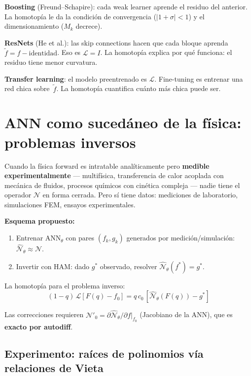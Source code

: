 \documentclass[11pt,a4paper]{article}
\begin{document}
\textbf{Boosting} (Freund--Schapire): cada weak learner aprende el residuo del anterior. La homotop\'ia le da la condici\'on de convergencia ($|1+\sigma|<1$) y el dimensionamiento ($M_k$ decrece).

\textbf{ResNets} (He et al.): las skip connections hacen que cada bloque aprenda $\tilde{f} = f - \text{identidad}$. Eso es $\mathcal{L} = I$. La homotop\'ia explica por qu\'e funciona: el residuo tiene menor curvatura.

\textbf{Transfer learning}: el modelo preentrenado es $\mathcal{L}$. Fine-tuning es entrenar una red chica sobre~$\tilde{f}$. La homotop\'ia cuantifica cu\'anto m\'as chica puede ser.


\section{ANN como suced\'aneo de la f\'isica: problemas inversos}
\label{sec:inverse}

Cuando la f\'isica forward es intratable anal\'iticamente pero \textbf{medible experimentalmente} --- multif\'isica, transferencia de calor acoplada con mec\'anica de fluidos, procesos qu\'imicos con cin\'etica compleja --- nadie tiene el operador $\mathcal{N}$ en forma cerrada. Pero s\'i tiene datos: mediciones de laboratorio, simulaciones FEM, ensayos experimentales.

\textbf{Esquema propuesto:}
\begin{enumerate}[nosep]
\item Entrenar ANN$_\theta$ con pares $(f_k, g_k)$ generados por medici\'on/simulaci\'on: $\hat{\mathcal{N}}_\theta \approx \mathcal{N}$.
\item Invertir con HAM: dado $g^*$ observado, resolver $\hat{\mathcal{N}}_\theta(f^*) = g^*$.
\end{enumerate}

La homotop\'ia para el problema inverso:
\begin{equation}
(1-q)\,\mathcal{L}[F(q) - f_0] = q\,c_0\,[\hat{\mathcal{N}}_\theta(F(q)) - g^*]
\end{equation}

Las correcciones requieren $\mathcal{N}'_0 = \partial\hat{\mathcal{N}}_\theta/\partial f\big|_{f_0}$ (Jacobiano de la ANN), que es \textbf{exacto por autodiff}.

\subsection{Experimento: ra\'ices de polinomios v\'ia relaciones de Vieta}
\end{document}
